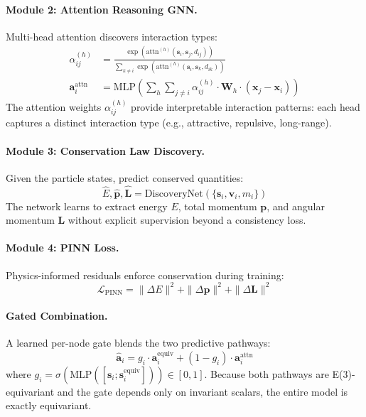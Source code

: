 \documentclass[10pt,twocolumn]{article}
\begin{document}
\paragraph{Module 2: Attention Reasoning GNN.}
Multi-head attention discovers interaction types:
\begin{align}
    \alpha_{ij}^{(h)} &= \frac{\exp(\text{attn}^{(h)}(\mathbf{s}_i, \mathbf{s}_j, d_{ij}))}{\sum_{k \neq i} \exp(\text{attn}^{(h)}(\mathbf{s}_i, \mathbf{s}_k, d_{ik}))} \\
    \mathbf{a}_i^{\text{attn}} &= \text{MLP}\left(\sum_h \sum_{j \neq i} \alpha_{ij}^{(h)} \cdot \mathbf{W}_h \cdot (\mathbf{x}_j - \mathbf{x}_i)\right)
\end{align}
The attention weights $\alpha_{ij}^{(h)}$ provide interpretable interaction patterns: each head captures a distinct interaction type (e.g., attractive, repulsive, long-range).

\paragraph{Module 3: Conservation Law Discovery.}
Given the particle states, predict conserved quantities:
\begin{equation}
    \hat{E}, \hat{\mathbf{p}}, \hat{\mathbf{L}} = \text{DiscoveryNet}(\{\mathbf{s}_i, \mathbf{v}_i, m_i\})
\end{equation}
The network learns to extract energy $E$, total momentum $\mathbf{p}$, and angular momentum $\mathbf{L}$ without explicit supervision beyond a consistency loss.

\paragraph{Module 4: PINN Loss.}
Physics-informed residuals enforce conservation during training:
\begin{equation}
    \mathcal{L}_{\text{PINN}} = \|\Delta E\|^2 + \|\Delta \mathbf{p}\|^2 + \|\Delta \mathbf{L}\|^2
\end{equation}

\paragraph{Gated Combination.}
A learned per-node gate blends the two predictive pathways:
\begin{equation}
    \hat{\mathbf{a}}_i = g_i \cdot \mathbf{a}_i^{\text{equiv}} + (1 - g_i) \cdot \mathbf{a}_i^{\text{attn}}
\end{equation}
where $g_i = \sigma(\text{MLP}([\mathbf{s}_i; \mathbf{s}_i^{\text{equiv}}])) \in [0,1]$. Because both pathways are E(3)-equivariant and the gate depends only on invariant scalars, the entire model is exactly equivariant.
\end{document}
